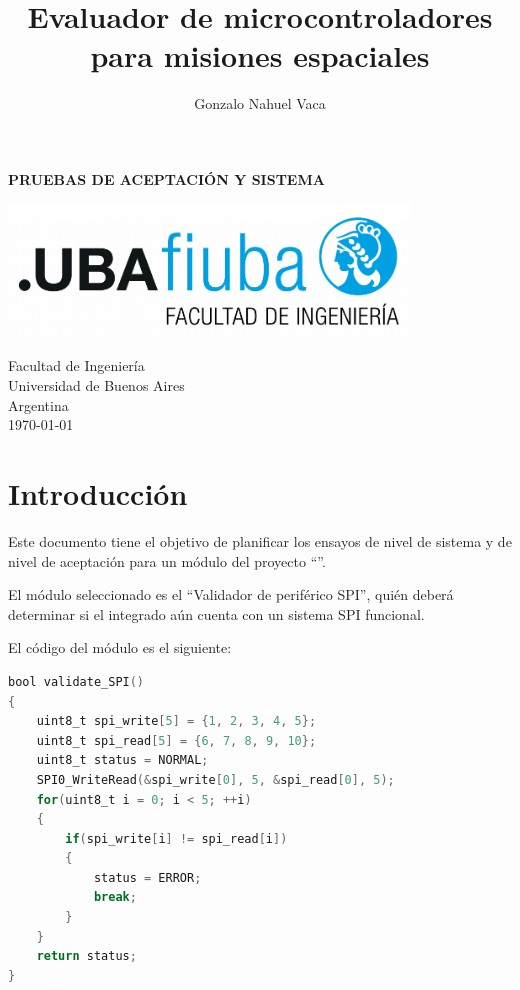 \documentclass[
    11pt,
    spanish,
	a4paper
]{article}
\title{Evaluador de microcontroladores para misiones espaciales}
\author{Gonzalo Nahuel Vaca}
\def\doctype{PRUEBAS DE ACEPTACIÓN Y SISTEMA}
\begin{document}
\makeatletter
\begin{titlepage}
	\begin{center}
		\vspace*{1cm}
		
		\Huge
		\textbf{\doctype}
		
		\vspace{0.5cm}
		\LARGE
		\@title
		
		\vspace{1.5cm}
		
		\textbf{\@author}

		\vspace{3.5cm}

		\includegraphics[width=0.8\textwidth]{img/logoFIUBA.pdf}
		
		\vfill
		Facultad de Ingeniería\\
		Universidad de Buenos Aires\\
		Argentina\\
		\today
	\end{center}
\end{titlepage}
\makeatother
\newpage

\section{Introducción}
\label{sec:introduccion}

Este documento tiene el objetivo de planificar los ensayos de nivel de sistema y de nivel de aceptación para un módulo del proyecto ``\MyTitle''.

El módulo seleccionado es el ``Validador de periférico SPI'', quién deberá determinar si el integrado aún cuenta con un sistema SPI funcional.

El código del módulo es el siguiente:

\begin{lstlisting}[language=C]
bool validate_SPI()
{
    uint8_t spi_write[5] = {1, 2, 3, 4, 5};
    uint8_t spi_read[5] = {6, 7, 8, 9, 10};
    uint8_t status = NORMAL;
    SPI0_WriteRead(&spi_write[0], 5, &spi_read[0], 5);
    for(uint8_t i = 0; i < 5; ++i)
    {
        if(spi_write[i] != spi_read[i])
        {
            status = ERROR;
            break;
        }
    }
    return status;
}
\end{lstlisting}
\end{document}
